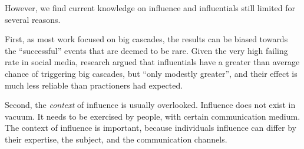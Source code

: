 \documentclass[phd,tocprelim]{cornell}
\begin{document}

However, we find current knowledge on influence and influentials still limited for several reasons. 

First, as most work focused on big cascades, the results can be biased towards the ``successful'' events that are deemed to be rare. Given the very high failing rate in social media, research\cite{Watts-2007,Bakshy-2011} argued that influentials have a greater than average chance of triggering big cascades, but ``only modestly greater'', and their effect is much less reliable than practioners had expected.

Second, the \emph{context} of influence is usually overlooked. Influence does not exist in vacuum. It needs to be exercised by people, with certain communication medium. The context of influence is important, because individuals influence can differ by their expertise\cite{Cha-2010}, the subject\cite{Leskovec-EC-2006}, and the communication channels\cite{Wu-Twitter-2011}.
\end{document}

